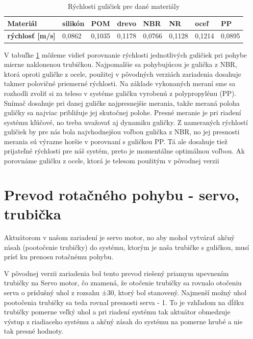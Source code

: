 \begin{table}[ht]
	\centering
	\begin{tabular}{|l|l|l|l|l|l|l|l|}
		\hline
		\textbf{Materiál}           & silikón & POM    & drevo  & NBR                            & NR     & oceľ                           & PP                             \\ \hline
		\textbf{rýchlosť {[}m/s{]}} & 0,0862  & 0,1035 & 0,1178 & \cellcolor[HTML]{9AFF99}0,0766 & 0,1128 & \cellcolor[HTML]{FFCCC9}0,1214 & \cellcolor[HTML]{FFFFFF}0,0895 \\ \hline
	\end{tabular}
    \caption{Rýchlosti guličiek pre dané materiály}
    \label{TABULKA_2_2}
\end{table}

V tabuľke \ref{TABULKA_2_2} môžeme vidieť porovnanie rýchlosti jednotlivých guličiek pri pohybe mierne naklonenou trubičkou. Najpomalšie sa pohybujúcou je gulička z NBR, ktorá oproti guličke z ocele, použitej v pôvodných verziách zariadenia dosahuje takmer polovičné priemerné rýchlosti.  
Na základe vykonaných meraní sme sa rozhodli zvoliť si za teleso v systéme guličku vyrobenú z polypropylénu (PP). Snímač dosahuje pri danej guličke najpresnejšie merania, takže meraná poloha guličky sa najviac približuje jej skutočnej polohe. Presné meranie je pri riadení systému kľúčové, no treba uvažovať aj dynamiku guličky. Z nameraných rýchlostí guličiek by pre nás bola najvhodnejšou voľbou gulička z NBR, no jej presnosti merania sú výrazne horšie v porovnaní s guličkou PP. Tá ale dosahuje tiež prijateľné rýchlosti pre náš systém, preto je momentálne optimálnou voľbou.
Ak porovnáme guličku z ocele, ktorá je telesom použitým v pôvodnej verzii

\section{Prevod rotačného pohybu - servo, trubička}  \textdegree
\label{kap:2.4}

Aktuátorom v našom zariadení je servo motor, no aby mohol vytvárať akčný zásah (pootočenie trubičky) do systému, ktorým je naša trubičke s guličkou, musí prísť ku prenosu rotačnému pohybu.
 
V pôvodnej verzii zariadenia bol tento prevod riešený priamym upevnením trubičky na Servo motor, čo znamená, že otočenie trubičky sa rovnalo otočeniu serva o príslušný uhol z rozsahu ±30\textdegree, ktorý bol stanovený. Najmenší možný uhol pootočenia trubičky sa teda rovnal presnosti serva - 1\textdegree. To je vzhľadom na dĺžku trubičky pomerne veľký uhol a pri riadení systému tak aktuátor obmedzuje výstup z riadiaceho systému a akčný zásah do systému na pomerne hrubé a nie tak presné hodnoty. 

